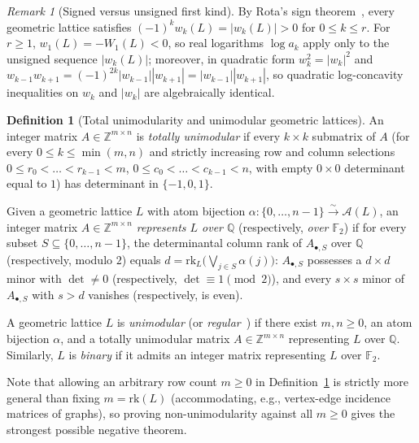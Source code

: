 \documentclass[11pt]{article}
\theoremstyle{definition}
\newtheorem{definition}[theorem]{Definition}
\theoremstyle{remark}
\newtheorem{remark}[theorem]{Remark}
\newcommand{\rk}{\mathrm{rk}}
\newcommand{\F}{\mathbb{F}}
\newcommand{\Q}{\mathbb{Q}}
\newcommand{\Z}{\mathbb{Z}}
\begin{document}
\begin{remark}[Signed versus unsigned first kind]
By Rota's sign theorem~\cite{Rota1964}, every geometric lattice satisfies
$(-1)^k w_k(L) = |w_k(L)| > 0$ for $0 \le k \le r$. For $r \ge 1$, $w_1(L) = -W_1(L) < 0$, so
real logarithms $\log a_k$ apply only to the unsigned sequence $|w_k(L)|$; moreover, in quadratic
form $w_k^2 = |w_k|^2$ and $w_{k-1}w_{k+1} = (-1)^{2k}|w_{k-1}||w_{k+1}| = |w_{k-1}||w_{k+1}|$,
so quadratic log-concavity inequalities on $w_k$ and $|w_k|$ are algebraically identical.
\end{remark}

\begin{definition}[Total unimodularity and unimodular geometric lattices]
\label{def:unimodular}
An integer matrix $A \in \Z^{m \times n}$ is \emph{totally unimodular} if every $k \times k$
submatrix of $A$ (for every $0 \le k \le \min(m, n)$ and strictly increasing row and column
selections $0 \le r_0 < \dots < r_{k-1} < m$, $0 \le c_0 < \dots < c_{k-1} < n$, with empty
$0 \times 0$ determinant equal to $1$) has determinant in $\{-1, 0, 1\}$.

Given a geometric lattice $L$ with atom bijection $\alpha : \{0, \dots, n-1\} \xrightarrow{\sim}
\mathcal{A}(L)$, an integer matrix $A \in \Z^{m \times n}$ \emph{represents $L$ over $\Q$}
(respectively, \emph{over $\F_2$}) if for every subset $S \subseteq \{0, \dots, n-1\}$, the
determinantal column rank of $A_{\bullet, S}$ over $\Q$ (respectively, modulo $2$) equals
$d = \rk_L\bigl(\bigvee_{j \in S} \alpha(j)\bigr)$: $A_{\bullet, S}$ possesses a $d \times d$
minor with $\det \neq 0$ (respectively, $\det \equiv 1 \pmod{2}$), and every $s \times s$ minor of
$A_{\bullet, S}$ with $s > d$ vanishes (respectively, is even).

A geometric lattice $L$ is \emph{unimodular} (or \emph{regular}~\cite{Tutte1958,White1986,Oxley2011})
if there exist $m, n \ge 0$, an atom bijection $\alpha$, and a totally unimodular matrix
$A \in \Z^{m \times n}$ representing $L$ over $\Q$. Similarly, $L$ is \emph{binary} if it admits
an integer matrix representing $L$ over $\F_2$.
\end{definition}

Note that allowing an arbitrary row count $m \ge 0$ in Definition~\ref{def:unimodular} is strictly
more general than fixing $m = \rk(L)$ (accommodating, e.g., vertex-edge incidence matrices of
graphs), so proving non-unimodularity against all $m \ge 0$ gives the strongest possible negative
theorem.
\end{document}
